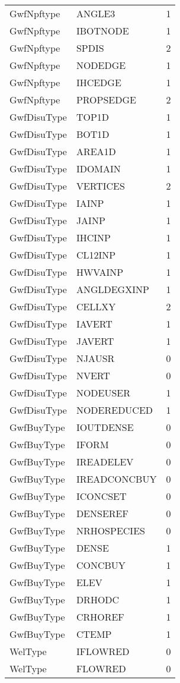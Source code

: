 \begin{longtable}{p{6cm} p{4cm} p{2cm} }
GwfNpftype &  ANGLE3 & 1 \\ 
GwfNpftype &  IBOTNODE & 1 \\ 
GwfNpftype &  SPDIS & 2 \\ 
GwfNpftype &  NODEDGE & 1 \\ 
GwfNpftype &  IHCEDGE & 1 \\ 
GwfNpftype &  PROPSEDGE & 2 \\ 
GwfDisuType &  TOP1D & 1 \\ 
GwfDisuType &  BOT1D & 1 \\ 
GwfDisuType &  AREA1D & 1 \\ 
GwfDisuType &  IDOMAIN & 1 \\ 
GwfDisuType &  VERTICES & 2 \\ 
GwfDisuType &  IAINP & 1 \\ 
GwfDisuType &  JAINP & 1 \\ 
GwfDisuType &  IHCINP & 1 \\ 
GwfDisuType &  CL12INP & 1 \\ 
GwfDisuType &  HWVAINP & 1 \\ 
GwfDisuType &  ANGLDEGXINP & 1 \\ 
GwfDisuType &  CELLXY & 2 \\ 
GwfDisuType &  IAVERT & 1 \\ 
GwfDisuType &  JAVERT & 1 \\ 
GwfDisuType &  NJAUSR & 0 \\ 
GwfDisuType &  NVERT & 0 \\ 
GwfDisuType &  NODEUSER & 1 \\ 
GwfDisuType &  NODEREDUCED & 1 \\ 
GwfBuyType &  IOUTDENSE & 0 \\ 
GwfBuyType &  IFORM & 0 \\ 
GwfBuyType &  IREADELEV & 0 \\ 
GwfBuyType &  IREADCONCBUY & 0 \\ 
GwfBuyType &  ICONCSET & 0 \\ 
GwfBuyType &  DENSEREF & 0 \\ 
GwfBuyType &  NRHOSPECIES & 0 \\ 
GwfBuyType &  DENSE & 1 \\ 
GwfBuyType &  CONCBUY & 1 \\ 
GwfBuyType &  ELEV & 1 \\ 
GwfBuyType &  DRHODC & 1 \\ 
GwfBuyType &  CRHOREF & 1 \\ 
GwfBuyType &  CTEMP & 1 \\ 
WelType &  IFLOWRED & 0 \\ 
WelType &  FLOWRED & 0 \\ 


\hline
\end{longtable}
\label{table:blocks}
\normalsize
